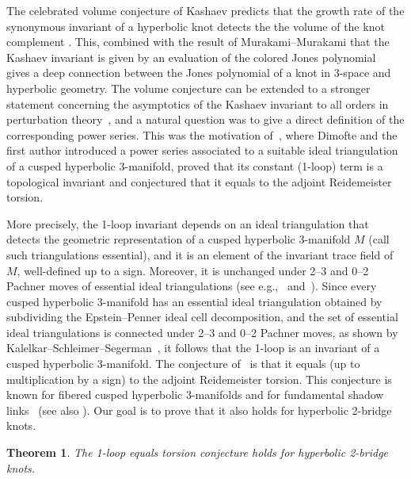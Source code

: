 \documentclass[12pt,reqno]{amsart}
\newtheorem{theorem}{Theorem}[section]
\theoremstyle{definition}
\begin{document}
The celebrated volume conjecture of Kashaev predicts that the growth rate of the
synonymous invariant of a hyperbolic knot detects the the volume of the knot
complement \cite{Kas95}. This, combined with the result of Murakami--Murakami
that the Kashaev invariant is given by an evaluation of the colored Jones polynomial
~\cite{MM01} gives a deep connection between the Jones polynomial of a knot in 3-space
and hyperbolic geometry. The volume conjecture can be extended to a stronger
statement concerning the asymptotics of the Kashaev invariant to all orders in
perturbation theory~\cite{GL:asy,DGLZ}, and a natural question was to give a direct
definition of the corresponding power series. This was the motivation of~\cite{DG1},
where Dimofte and the first author introduced a power series associated to a
suitable ideal triangulation of a cusped hyperbolic 3-manifold, proved that its
constant (1-loop) term is a topological invariant and conjectured that it equals
to the adjoint Reidemeister torsion. 

More precisely, the 1-loop invariant depends on an ideal triangulation that detects
the geometric representation of a cusped hyperbolic 3-manifold $M$ (call such
triangulations essential), and it is an element of the invariant trace field of
$M$, well-defined up to a sign.
Moreover, it is unchanged under 2--3 and 0--2 Pachner moves of essential ideal
triangulations (see e.g.,~\cite[Sec.3]{DG1} and~\cite[Prop.5.1]{PW2023}).
Since every cusped hyperbolic 3-manifold has an essential ideal triangulation
obtained by subdividing the Epstein--Penner ideal cell decomposition, and the set
of essential ideal triangulations is connected under 2--3 and 0--2 Pachner moves,
as shown by Kalelkar--Schleimer--Segerman~\cite{KSS24}, it follows that  
the 1-loop is an invariant of a cusped hyperbolic 3-manifold. The conjecture
of~\cite{DG1} is that it equals (up to multiplication by a sign) to the adjoint
Reidemeister torsion. This conjecture is known for fibered cusped hyperbolic
3-manifolds \cite{DGY2023} and for fundamental shadow links~\cite{PW2023}
(see also \cite{AW2024}). Our goal is to prove that it also holds for hyperbolic
2-bridge knots.

\begin{theorem}
\label{thm.main}
The 1-loop equals torsion conjecture holds for hyperbolic 2-bridge knots.
\end{theorem}
\end{document}
